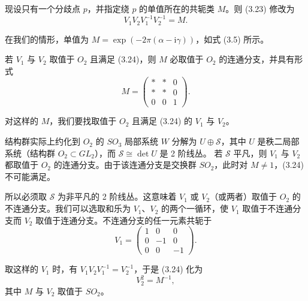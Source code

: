 \documentclass[11pt,a4paper]{article}
\begin{document}
现设只有一个分歧点 $p$，并指定绕 $p$ 的单值所在的共轭类 $M$。则 (3.23) 修改为
\begin{equation}\tag{3.24}
V_1V_2V_1^{-1}V_2^{-1}=M.
\end{equation}

在我们的情形，单值为 $M=\exp(-2\pi(\alpha-\mathrm{i}\gamma))$，如式 (3.5) 所示。

若 $V_1$ 与 $V_2$ 取值于 $O_2$ 且满足 (3.24)，则 $M$ 必取值于 $O_2$ 的连通分支，并具有形式
\begin{equation}\tag{3.25}
M=
\begin{pmatrix}
* & * & 0\\
* & * & 0\\
0 & 0 & 1
\end{pmatrix}.
\end{equation}

对这样的 $M$，我们要找取值于 $O_2$ 且满足 (3.24) 的 $V_1$ 与 $V_2$。

结构群实际上约化到 $O_2$ 的 $SO_3$ 局部系统 $W$ 分解为 $U\oplus\mathcal{S}$，其中 $U$ 是秩二局部系统（结构群 $O_2\subset GL_2$），而 $\mathcal{S}\cong\det U$ 是 2 阶线丛。
若 $\mathcal{S}$ 平凡，则 $V_1$ 与 $V_2$ 都取值于 $O_2$ 的连通分支。由于该连通分支是交换群 $SO_2$，此时对 $M\ne1$，(3.24) 不可能满足。

所以必须取 $\mathcal{S}$ 为非平凡的 2 阶线丛。这意味着 $V_1$ 或 $V_2$（或两者）取值于 $O_2$ 的不连通分支。我们可以选取和乐为 $V_1$、$V_2$ 的两个一循环，使 $V_1$ 取值于不连通分支而 $V_2$ 取值于连通分支。不连通分支的任一元素共轭于
\begin{equation}\tag{3.26}
V_1=
\begin{pmatrix}
1 & 0 & 0\\
0 & -1 & 0\\
0 & 0 & -1
\end{pmatrix}.
\end{equation}

取这样的 $V_1$ 时，有 $V_1V_2V_1^{-1}=V_2^{-1}$，于是 (3.24) 化为
\begin{equation}\tag{3.27}
V_2^2=M^{-1},
\end{equation}
其中 $M$ 与 $V_2$ 取值于 $SO_2$。
\end{document}
